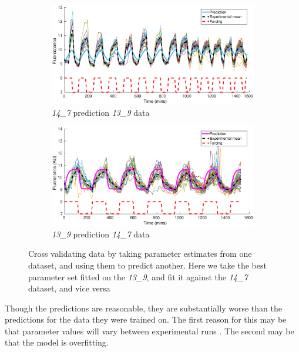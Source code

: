 \documentclass[10pt,journal]{./IEEE_latex_class/IEEEtran}
\begin{document}
 \begin{figure}[h!]	
	\begin{subfigure}[h]{0.49\textwidth}
    \centering
        \includegraphics[scale = 0.26]{14_7_pred_13_9_data}
        \caption{\textit{14\_7} prediction \textit{13\_9} data}
        \label{SensitivityMatrix_unscaled} 
    \end{subfigure}
    \begin{subfigure}[h]{0.49\textwidth}
    \centering
        \includegraphics[scale = 0.26]{13_9_pred_14_7_data}
        \caption{\textit{13\_9} prediction \textit{14\_7} data}
                \label{SensitivityMatrix_scaled} 
    \end{subfigure}
    \caption{Cross validating data by taking parameter estimates from one dataset, and using them to predict another. Here we take the best parameter set fitted on the \textit{13\_9}, and fit it against the \textit{14\_7} dataset, and vice versa } 
\label{CrossValidation}   
\end{figure}

Though the predictions are reasonable, they are substantially worse than the predictions for the data they were trained on. The first reason for this may be that parameter values will vary between experimental runs \cite{Hu2015}. The second may be that the model is overfitting.
 
\end{document}
